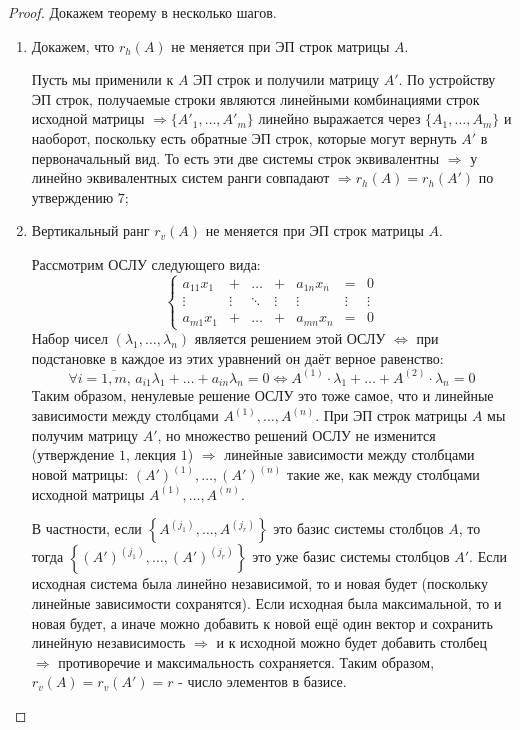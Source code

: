 \documentclass[12pt]{article}
\theoremstyle{definition}
\begin{document}
\begin{proof}
	Докажем теорему в несколько шагов.
	\begin{enumerate}[label=\arabic*)]
		\item Докажем, что $r_h(A)$ не меняется при ЭП строк матрицы $A$. 
		
		Пусть мы применили к $A$ ЭП строк и получили матрицу $A'$. По устройству ЭП строк, получаемые строки являются линейными комбинациями строк исходной матрицы $\Rightarrow \{A'_1,\dotsc, A'_m\}$ линейно выражается через $\{A_1,\dotsc, A_m\}$ и наоборот, поскольку есть обратные ЭП строк, которые могут вернуть $A'$ в первоначальный вид. То есть эти две системы строк эквивалентны $\Rightarrow$ у линейно эквивалентных систем ранги совпадают $\Rightarrow r_h(A) = r_h(A')$ по утверждению $7$;
		
		\item Вертикальный ранг $r_v(A)$ не меняется при ЭП строк матрицы $A$.
		
		Рассмотрим ОСЛУ следующего вида:
		$$
			\left\{
			\begin{array}{ccccccc}
				a_{11}x_1 & + & \dotsc & + & a_{1n}x_n & = & 0 \\
				\vdots & \vdots &  \ddots & \vdots & \vdots & \vdots & \vdots \\ 
				a_{m1}x_1 & + & \dotsc & + & a_{mn}x_n & = & 0 
			\end{array}
			\right.
		$$
		Набор чисел $(\lambda_1, \dotsc, \lambda_n)$ является решением этой ОСЛУ $\Leftrightarrow$ при подстановке в каждое из этих уравнений он даёт верное равенство:
		$$
			\forall i = \overline{1,m}, \, a_{i1}\lambda_1 + \dotsc + a_{in}\lambda_n = 0 \Leftrightarrow A^{(1)}{\cdot}\lambda_1 + \dotsc + A^{(2)}{\cdot}\lambda_n = 0
		$$
		Таким образом, ненулевые решение ОСЛУ это тоже самое, что и линейные зависимости между столбцами $A^{(1)}, \dotsc, A^{(n)}$. При ЭП строк матрицы $A$ мы получим матрицу $A'$, но множество решений ОСЛУ не изменится (утверждение $1$, лекция $1$) $\Rightarrow$ линейные зависимости между столбцами новой матрицы: $(A')^{(1)}, \dotsc, (A')^{(n)}$ такие же, как между столбцами исходной матрицы $A^{(1)}, \dotsc, A^{(n)}$. 
		
		В частности, если $\left\{A^{(j_1)}, \dotsc, A^{(j_r)}\right\}$ это базис системы столбцов $A$, то тогда $\left\{(A')^{(j_1)}, \dotsc, (A')^{(j_r)}\right\}$ это уже базис системы столбцов $A'$. Если исходная система была линейно независимой, то и новая будет (поскольку линейные зависимости сохранятся). Если исходная была максимальной, то и новая будет, а иначе можно добавить к новой ещё один вектор и сохранить линейную независимость $\Rightarrow$ и к исходной можно будет добавить столбец $\Rightarrow$ противоречие и максимальность сохраняется. Таким образом, $r_v(A) = r_v(A') = r$ - число элементов в базисе.
		

\end{enumerate}
\end{proof}
\end{document}
